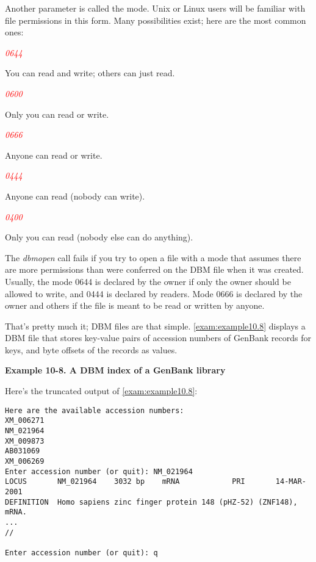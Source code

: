 Another parameter is called the mode. Unix or Linux users will be familiar with file permissions in this form. Many possibilities exist; here are the most common ones: 

\textcolor{red}{\textit{0644}}
\begin{adjustwidth}{1cm}{}
You can read and write; others can just read.
\end{adjustwidth}

\textcolor{red}{\textit{0600}}
\begin{adjustwidth}{1cm}{}
Only you can read or write.
\end{adjustwidth}

\textcolor{red}{\textit{0666}}
\begin{adjustwidth}{1cm}{}
Anyone can read or write.
\end{adjustwidth}

\textcolor{red}{\textit{0444}}
\begin{adjustwidth}{1cm}{}
Anyone can read (nobody can write).
\end{adjustwidth}

\textcolor{red}{\textit{0400}}
\begin{adjustwidth}{1cm}{}
Only you can read (nobody else can do anything).
\end{adjustwidth}

The \textit{dbmopen} call fails if you try to open a file with a mode that assumes there are more permissions than were conferred on the DBM file when it was created. Usually, the mode 0644 is declared by the owner if only the owner should be allowed to write, and 0444 is declared by readers. Mode 0666 is declared by the owner and others if the file is meant to be read or written by anyone.

That's pretty much it; DBM files are that simple. \autoref{exam:example10.8} displays a DBM file that stores key-value pairs of accession numbers of GenBank records for keys, and byte offsets of the records as values. 

\textbf{Example 10-8. A DBM index of a GenBank library}


Here's the truncated output of \autoref{exam:example10.8}:

\begin{lstlisting}
Here are the available accession numbers:
XM_006271
NM_021964
XM_009873
AB031069
XM_006269
Enter accession number (or quit): NM_021964
LOCUS       NM_021964    3032 bp    mRNA            PRI       14-MAR-2001
DEFINITION  Homo sapiens zinc finger protein 148 (pHZ-52) (ZNF148), mRNA.
...
//

Enter accession number (or quit): q
\end{lstlisting}

